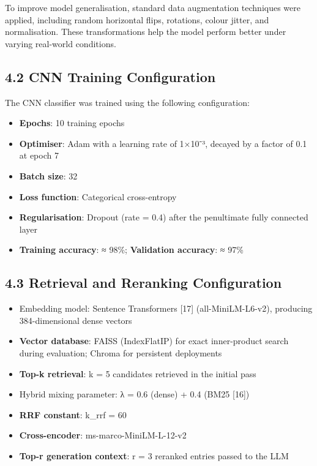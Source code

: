 To improve model generalisation, standard data augmentation techniques
were applied, including random horizontal flips, rotations, colour
jitter, and normalisation. These transformations help the model perform
better under varying real-world conditions.

\subsection*{4.2 CNN Training
Configuration}\label{cnn-training-configuration}

The CNN classifier was trained using the following configuration:

\begin{itemize}
\item
  \textbf{Epochs}: 10 training epochs
\item
  \textbf{Optimiser}: Adam with a learning rate of 1×10⁻³, decayed by a
  factor of 0.1 at epoch 7
\item
  \textbf{Batch size}: 32
\item
  \textbf{Loss function}: Categorical cross-entropy
\item
  \textbf{Regularisation}: Dropout (rate = 0.4) after the penultimate
  fully connected layer
\item
  \textbf{Training accuracy}: ≈ 98\%; \textbf{Validation accuracy}: ≈
  97\%
\end{itemize}

\subsection*{4.3 Retrieval and Reranking
Configuration}\label{retrieval-and-reranking-configuration}

\begin{itemize}
\item
  Embedding model: Sentence Transformers {[}17{]} (all-MiniLM-L6-v2),
  producing 384-dimensional dense vectors
\item
  \textbf{Vector database}: FAISS (IndexFlatIP) for exact inner-product
  search during evaluation; Chroma for persistent deployments
\item
  \textbf{Top-k retrieval}: k = 5 candidates retrieved in the initial
  pass
\item
  Hybrid mixing parameter: λ = 0.6 (dense) + 0.4 (BM25 {[}16{]})
\item
  \textbf{RRF constant}: k\_rrf = 60
\item
  \textbf{Cross-encoder}: ms-marco-MiniLM-L-12-v2
\item
  \textbf{Top-r generation context}: r = 3 reranked entries passed to
  the LLM
\end{itemize}

